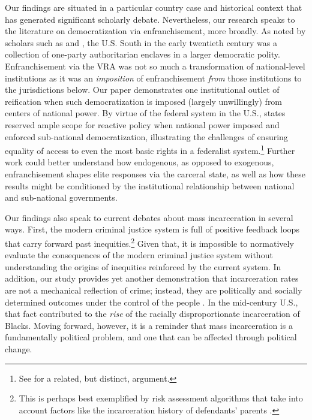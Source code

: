 \documentclass[12pt]{article}
\begin{document}
Our findings are situated in a particular country case and historical context that has generated significant scholarly debate.  Nevertheless, our research speaks to the literature on democratization via enfranchisement, more broadly. As noted by scholars such as \cite{KeyJr:1950ta} and \cite{Mickey:2015vh}, the U.S. South in the early twentieth century was a collection of one-party authoritarian enclaves in a larger democratic polity.  Enfranchisement via the VRA was not so much a transformation of national-level institutions as it was an \emph{imposition} of enfranchisement \emph{from} those institutions to the jurisdictions below.  Our paper demonstrates one institutional outlet of reification when such democratization is imposed (largely unwillingly) from centers of national power. By virtue of the federal system in the U.S., states reserved ample scope for reactive policy when national power imposed and enforced sub-national democratization, illustrating the challenges of ensuring equality of access to even the most basic rights in a federalist system.\footnote{See \cite{Miller:2008wb} for a related, but distinct, argument.} Further work could better understand how endogenous, as opposed to exogenous, enfranchisement shapes elite responses via the carceral state, as well as how these results might be conditioned by the institutional relationship between national and sub-national governments.

Our findings also speak to current debates about mass incarceration in several ways. First, the modern criminal justice system is full of positive feedback loops that carry forward past inequities.\footnote{This is perhaps best exemplified by risk assessment algorithms that take into account factors like the incarceration history of defendants' parents \citep{ProPublica2016}.} Given that, it is impossible to normatively evaluate the consequences of the modern criminal justice system without understanding the origins of inequities reinforced by the current system.  In addition, our study provides yet another demonstration that incarceration rates are not a mechanical reflection of crime; instead, they are politically and socially determined outcomes under the control of the people \citep{Garland:1990uv}. In the mid-century U.S., that fact contributed to the \emph{rise} of the racially disproportionate incarceration of Blacks. Moving forward, however, it is a reminder that mass incarceration is a fundamentally political problem, and one that can be affected through political change.
\end{document}
